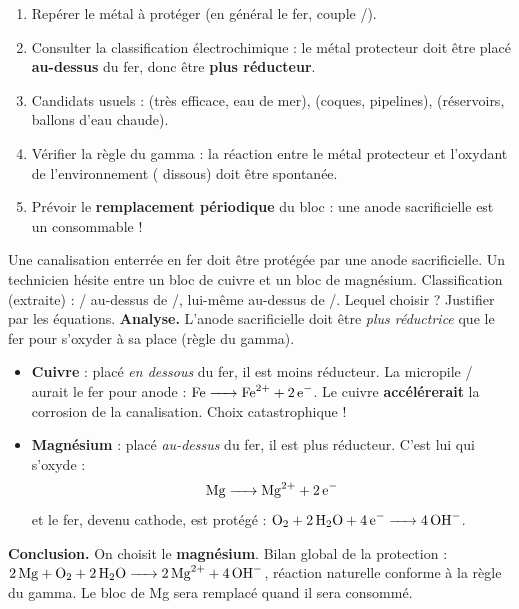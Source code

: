 \documentclass[11pt]{article}
\begin{document}
\begin{methode}
\begin{enumerate}
\item Repérer le métal à protéger (en général le fer, couple /).
\item Consulter la classification électrochimique : le métal protecteur doit être placé \textbf{au-dessus} du fer, donc être \textbf{plus réducteur}.
\item Candidats usuels :  (très efficace, eau de mer),  (coques, pipelines),  (réservoirs, ballons d'eau chaude).
\item Vérifier la règle du gamma : la réaction entre le métal protecteur et l'oxydant de l'environnement ( dissous) doit être spontanée.
\item Prévoir le \textbf{remplacement périodique} du bloc : une anode sacrificielle est un consommable !
\end{enumerate}
\end{methode}

\begin{exoresolu}
Une canalisation enterrée en fer doit être protégée par une anode sacrificielle. Un technicien hésite entre un bloc de cuivre et un bloc de magnésium. Classification (extraite) : / au-dessus de /, lui-même au-dessus de /. Lequel choisir ? Justifier par les équations.
\tcblower
\textbf{Analyse.} L'anode sacrificielle doit être \emph{plus réductrice} que le fer pour s'oxyder à sa place (règle du gamma).
\begin{itemize}
\item \textbf{Cuivre} : placé \emph{en dessous} du fer, il est moins réducteur. La micropile / aurait le fer pour anode : $\ce{Fe -> Fe^2+ + 2e-}$. Le cuivre \textbf{accélérerait} la corrosion de la canalisation. Choix catastrophique !
\item \textbf{Magnésium} : placé \emph{au-dessus} du fer, il est plus réducteur. C'est lui qui s'oxyde :
\[ \ce{Mg -> Mg^2+ + 2e-} \]
et le fer, devenu cathode, est protégé : $\ce{O2 + 2H2O + 4e- -> 4OH-}$.
\end{itemize}
\textbf{Conclusion.} On choisit le \textbf{magnésium}. Bilan global de la protection : $\ce{2Mg + O2 + 2H2O -> 2Mg^2+ + 4OH-}$, réaction naturelle conforme à la règle du gamma. Le bloc de Mg sera remplacé quand il sera consommé.
\end{exoresolu}
\end{document}
